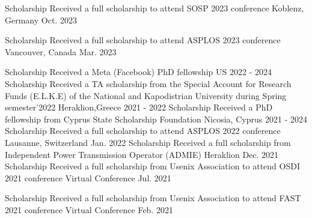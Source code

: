 
\begin{cvhonors}
	\cvhonor
	{Scholarship} %
	{Received a full scholarship to attend SOSP 2023 conference} %
	{Koblenz, Germany} %
	{Oct. 2023} %

	\cvhonor
	{Scholarship} %
	{Received a full scholarship to attend ASPLOS 2023 conference} %
	{Vancouver, Canada} %
	{Mar. 2023} %

	\cvhonor
	{Scholarship} %
	{Received a Meta (Facebook) PhD fellowship} %
	{US} %
	{2022 - 2024} %
	\cvhonor
	{Scholarship} %
	{Received a TA scholarship from the Special Account for Research Funds (E.L.K.E) of the National and Kapodistrian University during Spring semester’2022} %
	{Heraklion,Greece} %
	{2021 - 2022} %
	\cvhonor
	{Scholarship} %
	{Received a PhD fellowship from Cyprus State Scholarship Foundation} %
	{Nicosia, Cyprus} %
	{2021 - 2024} %
	\cvhonor
	{Scholarship} %
	{Received a full scholarship to attend ASPLOS 2022 conference} %
	{Lausanne, Switzerland} %
	{Jan. 2022} %
	\cvhonor
	{Scholarship} %
	{Received a full scholarship from Independent Power Transmission
		Operator (ADMIE)} %
	{Heraklion} %
	{Dec. 2021} %
	\cvhonor
	{Scholarship} %
	{Received a full scholarship from Usenix Association to attend
		OSDI 2021 conference} %
	{Virtual Conference} %
	{Jul. 2021} %

	\cvhonor
	{Scholarship} %
	{Received a full scholarship from Usenix Association to attend
		FAST 2021 conference
	} %
	{Virtual Conference} %
	{Feb. 2021} %


\end{cvhonors}
